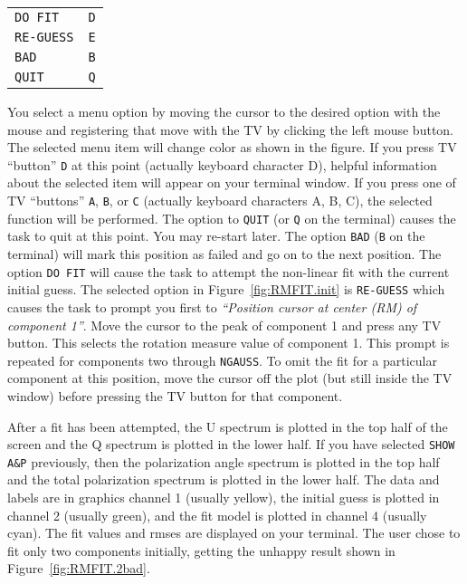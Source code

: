 \documentclass[twoside]{article}
\newcommand{\Hi}[1]{\textcolor{hicol}{#1}}
\begin{document}
\begin{center}
\begin{tabular}{|l|l|}\hline
   {\tt DO FIT}   & {\tt D} \\
   {\tt RE-GUESS} & {\tt E} \\
   {\tt BAD}      & {\tt B} \\
   {\tt QUIT}     & {\tt Q} \\ \hline
\end{tabular}
\end{center}
You select a menu option by moving the cursor to the desired option
with the mouse and registering that move with the TV by clicking the
left mouse button.  The selected menu item will change color as shown
in the figure.  If you press TV ``button'' {\tt D} at this point
(actually keyboard character D), helpful information about the
selected item will appear on your terminal window.  If you press one
of TV ``buttons'' {\tt A}, {\tt B}, or {\tt C} (actually keyboard
characters A, B, C), the selected function will be performed.  The
option to {\tt QUIT} (or {\tt Q} on the terminal) causes the task to
quit at this point.  You may re-start later.  The option {\tt BAD}
({\tt B} on the terminal) will mark this position as failed and go on
to the next position.  The option {\tt DO FIT} will cause the task to
attempt the non-linear fit with the current initial guess.  The
selected option in Figure~\ref{fig:RMFIT.init} is {\tt RE-GUESS} which
causes the task to prompt you first to {\it ``Position cursor at
  center (RM) of component 1''}.  Move the cursor to the peak of
component 1 and press any TV button.  This selects the rotation
measure value of component 1.  This prompt is repeated for components
two through {\tt NGAUSS}\@.  To omit the fit for a particular
component at this position, move the cursor off the plot (but still
inside the TV window) before pressing the TV button for that
component.

After a fit has been attempted, the U spectrum is plotted in the top
half of the screen and the Q spectrum is plotted in the lower half.
\Hi{If you have selected {\tt SHOW A\&P} previously, then the
polarization angle spectrum is plotted in the top half and the total
polarization spectrum is plotted in the lower half.}  The data and
labels are in graphics channel 1 (usually yellow), the initial guess
is plotted in channel 2 (usually green), and the fit model is plotted
in channel 4 (usually cyan).  The fit values and rmses are displayed
on your terminal.  The user chose to fit only two components
initially, getting the unhappy result shown in
Figure~\ref{fig:RMFIT.2bad}.
\end{document}
